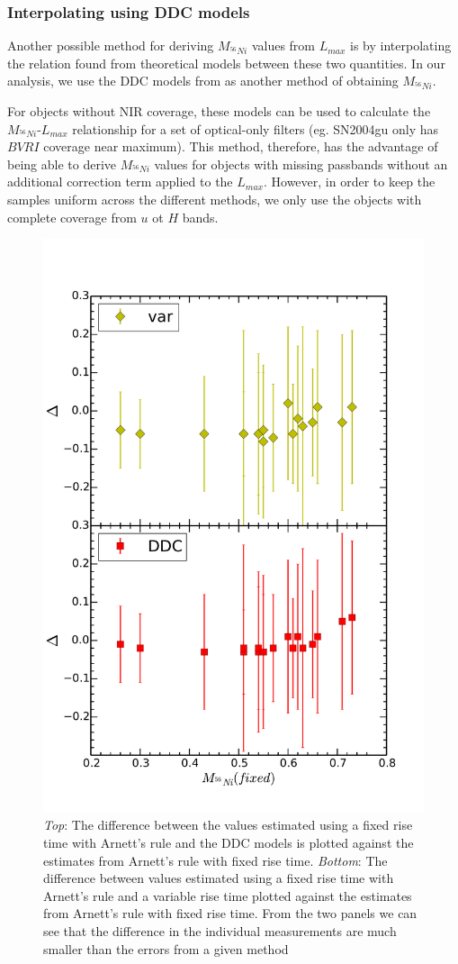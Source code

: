 
\subsubsection{Interpolating using DDC models}
Another possible method for deriving   $M_{^{56}Ni}$ values from $L_{max}$ is by interpolating the relation found from theoretical models between these two quantities. In our analysis, we use the DDC models from \citet{Blondin2013} as another method of obtaining $M_{^{56}Ni}$.

For objects without NIR coverage, these models can be used to calculate the $M_{^{56}Ni}$-$L_{max}$ relationship for a set of optical-only filters (eg. SN2004gu only has $BVRI$ coverage near maximum). 
This method, therefore, has the advantage of being able to derive $M_{^{56}Ni}$ values for objects with missing passbands without an additional correction term applied to the $L_{max}$. However, in order to keep the samples uniform across the different methods, we only use the objects with complete coverage from $u$ ot $H$ bands. 


\begin{figure}
\includegraphics[width=.5\textwidth, trim= 0 30 0 30]{../plot_rel/dif_ni_comp.pdf}
\caption{\emph{Top}: The difference between the values estimated using a fixed rise time with Arnett's rule and the DDC models is plotted against the estimates from Arnett's rule with fixed rise time. \emph{Bottom}: The difference between values estimated using a fixed rise time with Arnett's rule and a variable rise time plotted against the estimates from Arnett's rule with fixed rise time. From the two panels we can see that the difference in the individual measurements are much smaller than the errors from a given method}
\label{fig:difarn}
\end{figure}


